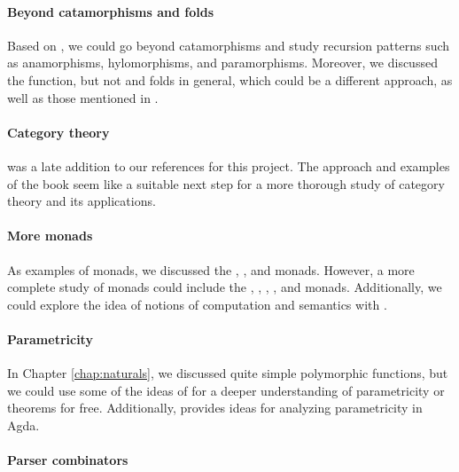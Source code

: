 \paragraph{Beyond catamorphisms and folds}

Based on \parencites{meijer-fokkinga-paterson-1991}{vene-2000}, we
could go beyond catamorphisms and study recursion patterns such as
anamorphisms, hylomorphisms, and paramorphisms. Moreover, we discussed
the  function, but not  and
folds in general, which could be a different approach, as well as
those mentioned in \parencite[§ 6]{hutton-1999}.

\paragraph{Category theory}

\textcite{awodey-2010} was a late addition to our references for this
project. The approach and examples of the book seem like a suitable
next step for a more thorough study of category theory and its
applications.

\paragraph{More monads}

As examples of monads, we discussed the ,
, and \texthaskell{[]} monads. However, a more
complete study of monads could include the ,
, , , and
 monads. Additionally, we could explore the idea
of notions of computation and semantics with \parencite{moggi-1991}.

\paragraph{Parametricity}

In Chapter \ref{chap:naturals}, we discussed quite simple polymorphic
functions, but we could use some of the ideas of
\parencite{wadler-1989} for a deeper understanding of parametricity or
theorems for free. Additionally, \parencite{bernardy-et-al-2012}
provides ideas for analyzing parametricity in Agda.

\paragraph{Parser combinators}

